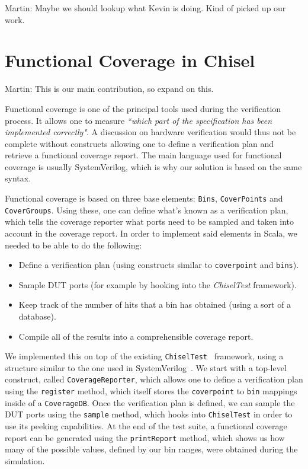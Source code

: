 \documentclass[conference]{IEEEtran}
\newcommand{\martin}[1]{{\color{blue} Martin: #1}}
\begin{document}
\martin{Maybe we should lookup what Kevin is doing. Kind of picked up our work.}

\section{Functional Coverage in Chisel}

\martin{This is our main contribution, so expand on this.}

Functional coverage is one of the principal tools used during the verification process. It allows one to measure \textit{``which part of the specification has been implemented correctly"}. A discussion on hardware verification would thus not be complete without constructs allowing one to define a verification plan and retrieve a functional coverage report. The main language used for functional coverage is usually SystemVerilog, which is why our solution is based on the same syntax. 

Functional coverage is based on three base elements: \texttt{Bins}, \texttt{CoverPoints} and \texttt{CoverGroups}. Using these, one can define what's known as a verification plan, which tells the coverage reporter what ports need to be sampled and taken into account in the coverage report.
In order to implement said elements in Scala, we needed to be able to do the following:
\begin{itemize}
\item Define a verification plan (using constructs similar to \texttt{coverpoint} and \texttt{bins}).
\item Sample DUT ports (for example by hooking into the \textit{ChiselTest} framework).
\item Keep track of the number of hits that a bin has obtained (using a sort of a database).
\item Compile all of the results into a comprehensible coverage report.
\end{itemize}

We implemented this on top of the existing \texttt{ChiselTest}~\cite{chisel:tester2} framework, using a structure similar to the one used in SystemVerilog~\cite{spear2008systemverilog}. We start with a top-level construct, called \texttt{CoverageReporter}, which allows one to define a verification plan using the \texttt{register} method, which itself stores the \texttt{coverpoint} to \texttt{bin} mappings inside of a \texttt{CoverageDB}. Once the verification plan is defined, we can sample the DUT ports using the \texttt{sample} method, which hooks into \texttt{ChiselTest} in order to use its peeking capabilities. At the end of the test suite, a functional coverage report can be generated using the \texttt{printReport} method, which shows us how many of the possible values, defined by our bin ranges, were obtained during the simulation.
\end{document}
